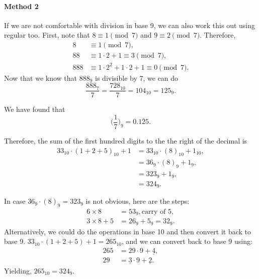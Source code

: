 \documentclass[11pt,twoside]{scrartcl}
\begin{document}
\begin{problem}
\begin{sketch}
          \paragraph{Method 2} If we are not comfortable with division in base 9, we can also work this out using regular too. First, note that $8 \equiv 1 \pmod{7}$ and $9 \equiv 2 \pmod{7}$. Therefore,
          \begin{align*}
              8 &\equiv 1 \pmod{7}, \\
              88 &\equiv 1 \cdot 2 + 1 \equiv 3 \pmod{7}, \\
              888 &\equiv 1 \cdot 2^2 + 1 \cdot 2 + 1 \equiv 0 \pmod{7}.
          \end{align*} 
          Now that we know that $888_9$ is divisible by 7, we can do
          \[\frac{888_7}{7} = \frac{728_{10}}{7} = 104_{10} = 125_9.\]

          We have found that
          \[\Big(\frac{1}{7}\Big)_9 = 0.\overline{125}.\]


          Therefore, the sum of the first hundred digits to the the right of the decimal is 
          \begin{align*}
              33_{10}\cdot(1+2+5)_{10} + 1 &= 33_{10}\cdot(8)_{10} + 1_{10}, \\
              &= 36_{9}\cdot(8)_{9} + 1_9, \\
              &= 323_9 + 1_9, \\
              &= \boxed{324_9}.  
          \end{align*}
          
          In case $36_{9}\cdot(8)_{9} = 323_9$ is not obvious, here are the steps:
          \begin{align*}
              6 \times 8 &= 53_9, \text{carry of 5}, \\
              3 \times 8 + 5 &= 26_9 + 5_9 = 32_9.
          \end{align*}
          Alternatively, we could do the operations in base 10 and then convert it back to base 9. $33_{10}\cdot(1+2+5)+1=265_{10}$, and we can convert back to base 9 using:
          \begin{align*}
              265 &= 29 \cdot 9 + \underline{4}, \\
              29 &= \underline{3} \cdot 9 + \underline{2}.
          \end{align*}
          Yielding, $265_{10} = 324_9$.
    \end{sketch}
\end{problem}
\end{document}
